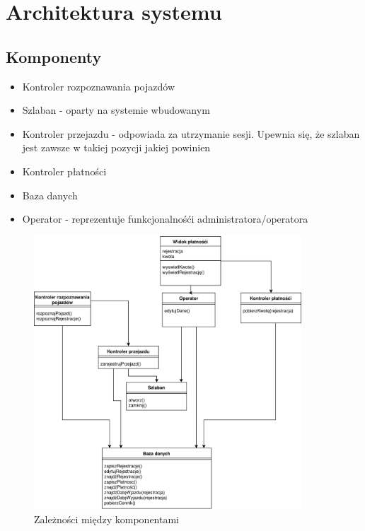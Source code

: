 \chapter{Architektura systemu}

\section{Komponenty}

\begin{itemize}
  \item Kontroler rozpoznawania pojazdów
  \item Szlaban - oparty na systemie wbudowanym
  \item Kontroler przejazdu - odpowiada za utrzymanie sesji. Upewnia się, że szlaban jest zawsze w takiej pozycji jakiej powinien
  \item Kontroler płatności
  \item Baza danych
  \item Operator - reprezentuje funkcjonalnośći administratora/operatora
\end{itemize}

\begin{figure}[H]
	\centering
  \includegraphics[width=100mm]{diagramy/komponentyZaleznosci.png}
  \caption{Zależności między komponentami}
\end{figure}


